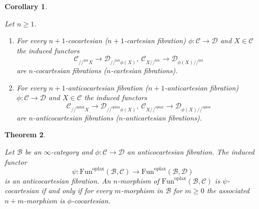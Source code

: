 \documentclass[10pt,oneside]{article}
\numberwithin{equation}{section} %
\numberwithin{figure}{section} %
\theoremstyle{plain}
\newtheorem{theorem}{Theorem}[subsection]
\newtheorem{corollary}[theorem]{Corollary}
\theoremstyle{definition}
\newcommand{\mB}{{\mathcal B}}
\newcommand{\mC}{{\mathcal C}}
\newcommand{\mD}{{\mathcal D}}
\newcommand{\n}{{n}}
\newcommand{\Fun}{\mathrm{Fun}}
\newcommand{\lax}{{\mathrm{lax}}}
\newcommand{\oplax}{{\mathrm{oplax}}}
\begin{document}
\begin{corollary}\label{slicecocar}

Let $ n \geq 1$.

\begin{enumerate}[\normalfont(1)]\setlength{\itemsep}{-2pt}
\item For every $n+1$-cocartesian ($n+1$-cartesian fibration) $\phi: \mC \to \mD$
and $X \in \mC$ the induced functors $$ \mC_{//^\lax X} \to \mD_{//^\lax \phi(X) }, \ \mC_{X //^\lax} \to \mD_{\phi(X) //^\lax} $$
are $n$-cocartesian fibrations ($n$-cartesian fibrations).

\item For every $n+1$-anticocartesian fibration ($n+1$-anticartesian fibration) $\phi: \mC \to \mD$
and $X \in \mC$ the induced functors $$ \mC_{//^\oplax X} \to \mD_{//^\oplax \phi(X) }, \ \mC_{X //^\oplax} \to \mD_{\phi(X) //^\oplax} $$
are $n$-anticocartesian fibrations ($n$-anticartesian fibrations).

\end{enumerate}
    
\end{corollary}

\begin{theorem}\label{indufibr}

Let $\mB$ be an $\infty$-category and $\phi: \mC \to \mD$ an anticocartesian fibration. The induced functor
$$\psi: \Fun^\oplax(\mB, \mC) \to \Fun^\oplax(\mB, \mD) $$
is an anticocartesian fibration.
An $\n$-morphism of $\Fun^\oplax(\mB, \mC)$ is $\psi$-cocartesian if and only if for every $m$-morphism in $\mB$ for $m \geq 0$ the associated
$n +m$-morphism is $\phi$-cocartesian. 
    
\end{theorem}
\end{document}
